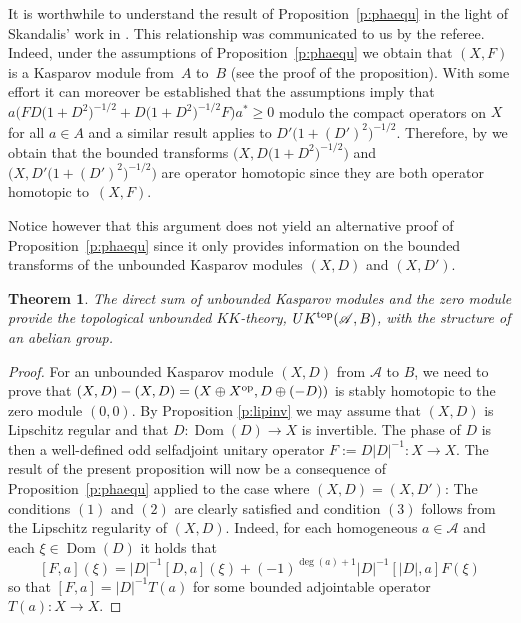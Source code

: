 \documentclass[pdftex]{sigma}
\numberwithin{equation}{section}
\newtheorem{Theorem}{Theorem}[section]
\newcommand{\op}{\oplus}
\newcommand{\s}[1]{\mathscr{#1}}
\begin{document}
\begin{rem}It is worthwhile to understand the result of Proposition~\ref{p:phaequ} in the light of Skandalis' work in \cite{Ska:SRK}. This relationship was communicated to us by the referee. Indeed, under the assumptions of Proposition~\ref{p:phaequ} we obtain that $(X,F)$ is a Kasparov module from~$A$ to~$B$ (see the proof of the proposition). With some effort it can moreover be established that the assumptions imply that $a \big( F D\big(1 + D^2\big)^{-1/2} + D\big(1 + D^2\big)^{-1/2} F\big)a^* \geq 0$ modulo the compact operators on $X$ for all $a \in A$ and a similar result applies to $D'\big(1 + (D')^2\big)^{-1/2}$. Therefore, by \cite[Lemma~11]{Ska:SRK} we obtain that the bounded transforms $\big(X,D\big(1+D^2\big)^{-1/2}\big)$ and $\big(X,D'\big(1 + (D')^2\big)^{-1/2}\big)$ are operator homotopic since they are both operator homotopic to~$(X,F)$.

Notice however that this argument does not yield an alternative proof of Proposition~\ref{p:phaequ} since it only provides information on the bounded transforms of the unbounded Kasparov modules $(X,D)$ and $(X,D')$.
\end{rem}

\begin{Theorem}\label{t:group}The direct sum of unbounded Kasparov modules and the zero module provide the topological unbounded $KK$-theory, $UK^{{\rm top}}(\s A,B)$, with the structure of an abelian group.
\end{Theorem}
\begin{proof}For an unbounded Kasparov module $(X,D)$ from $\s A$ to $B$, we need to prove that $(X,D) - (X,D) = (X \op X^{{\rm op}}, D \op (-D))$ is stably homotopic to the zero module $(0,0)$. By Proposition \ref{p:lipinv} we may assume that $(X,D)$ is Lipschitz regular and that $D \colon \operatorname{Dom}(D) \to X$ is invertible. The phase of $D$ is then a well-defined odd selfadjoint unitary operator $F := D |D|^{-1}\colon X \to X$. The result of the present proposition will now be a consequence of Proposition~\ref{p:phaequ} applied to the case where $(X,D) = (X,D')$: The conditions $(1)$ and $(2)$ are clearly satisfied and condition $(3)$ follows from the Lipschitz regularity of $(X,D)$. Indeed, for each homogeneous $a \in \s A$ and each $\xi \in \operatorname{Dom}(D)$ it holds that
\[
[F,a](\xi) = |D|^{-1} [D,a](\xi) + (-1)^{\deg (a) + 1} |D|^{-1} [ |D|,a ] F(\xi)
\]
so that $[F,a] = |D|^{-1} T(a)$ for some bounded adjointable operator $T(a)\colon X \to X$.
\end{proof}
\end{document}
